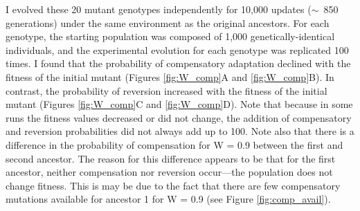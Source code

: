 \begin{doublespace}
I evolved these 20 mutant genotypes independently
for 10,000 updates ($\sim$~850 generations)
under the same environment as the original ancestors.
%
For each genotype, the starting population
was composed of 1,000 genetically-identical individuals,
and the experimental evolution for each genotype was replicated 100 times.
%
I found that the probability of compensatory adaptation
declined with the fitness of the initial mutant
(Figures \ref{fig:W_comp}A and \ref{fig:W_comp}B).
%
In contrast, the probability of reversion
increased with the fitness of the initial mutant
(Figures \ref{fig:W_comp}C and \ref{fig:W_comp}D).
%
Note that because in some runs the fitness values decreased or did not change,
the addition of compensatory and reversion probabilities
did not always add up to 100.
%
Note also that there is a difference in the probability of compensation
for W = 0.9 between the first and second ancestor.
%
The reason for this difference appears to be that
for the first ancestor, neither compensation nor reversion
occur---the population does not change fitness.
%
This is may be due to the fact that there are few compensatory mutations
available for ancestor 1 for W = 0.9 (see Figure \ref{fig:comp_avail}).




\end{doublespace}
